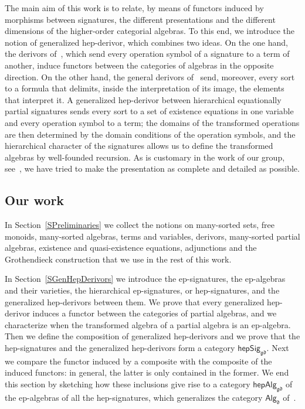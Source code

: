 \documentclass[a4paper, reqno
]{amsart}
\newcommand{\gd}{\mathfrak{gd}}              %
\theoremstyle{plain}
\theoremstyle{definition}
\begin{document}
The main aim of this work is to relate, by means of functors induced by morphisms between signatures, the different presentations and the different dimensions of the higher-order categorial algebras.
To this end, we introduce the notion of generalized hep-derivor, which combines two ideas.
On the one hand, the derivors of~\cite{CVST10b}, which send every operation symbol of a signature to a term of another, induce functors between the categories of algebras in the opposite direction.
On the other hand, the general derivors of~\cite{LG18} send, moreover, every sort to a formula that delimits, inside the interpretation of its image, the elements that interpret it.
A generalized hep-derivor between hierarchical equationally partial signatures sends every sort to a set of existence equations in one variable and every operation symbol to a term; the domains of the transformed operations are then determined by the domain conditions of the operation symbols, and the hierarchical character of the signatures allows us to define the transformed algebras by well-founded recursion.
As is customary in the work of our group, see~\cite{CVCL16, CVCL18, CVCL23, CVCLRM26}, we have tried to make the presentation as complete and detailed as possible.

\subsection{Our work}

In Section~\ref{SPreliminaries} we collect the notions on many-sorted sets, free monoids, many-sorted algebras, terms and variables, derivors, many-sorted partial algebras, existence and quasi-existence equations, adjunctions and the Grothendieck construction that we use in the rest of this work.

In Section~\ref{SGenHepDerivors} we introduce the ep-signatures, the ep-algebras and their varieties, the hierarchical ep-signatures, or hep-signatures, and the generalized hep-derivors between them.
We prove that every generalized hep-derivor induces a functor between the categories of partial algebras, and we characterize when the transformed algebra of a partial algebra is an ep-algebra.
Then we define the composition of generalized hep-derivors and we prove that the hep-signatures and the generalized hep-derivors form a category $\mathsf{hepSig}_{\gd}$.
Next we compare the functor induced by a composite with the composite of the induced functors: in general, the latter is only contained in the former.
We end this section by sketching how these inclusions give rise to a category $\mathsf{hepAlg}_{\gd}$ of the ep-algebras of all the hep-signatures, which generalizes the category $\mathsf{Alg}_{\mathfrak{d}}$ of~\cite{CVST10b}.
\end{document}
